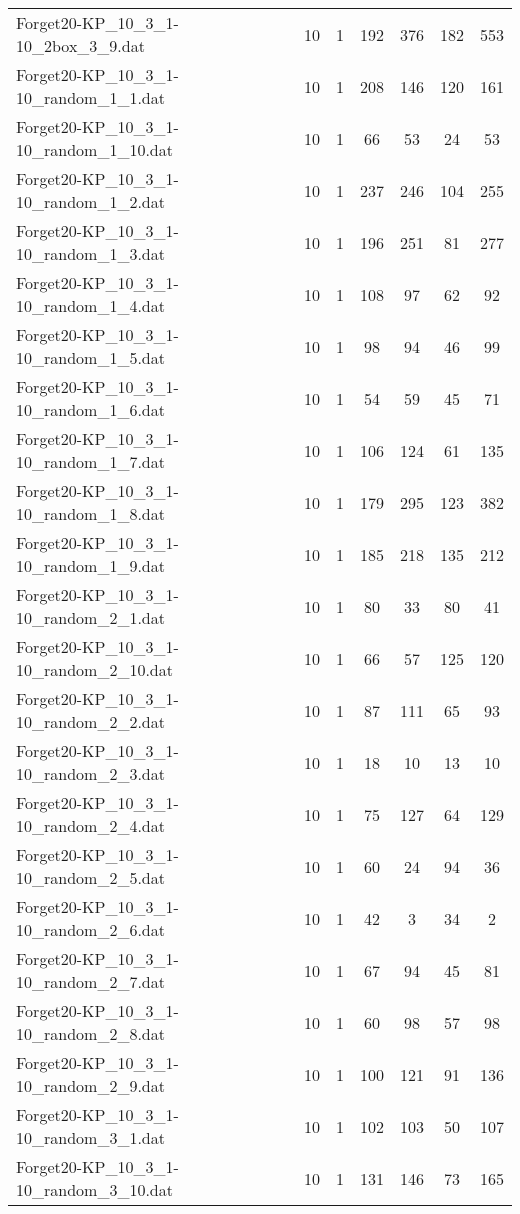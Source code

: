 \begin{table}[!ht]
\begin{tabular}{lcccccc}
Forget20-KP\_10\_3\_1-10\_2box\_3\_9.dat & 10 & 1 & 192 & 376 & 182 & 553 \\
Forget20-KP\_10\_3\_1-10\_random\_1\_1.dat & 10 & 1 & 208 & 146 & 120 & 161 \\
Forget20-KP\_10\_3\_1-10\_random\_1\_10.dat & 10 & 1 & 66 & 53 & 24 & 53 \\
Forget20-KP\_10\_3\_1-10\_random\_1\_2.dat & 10 & 1 & 237 & 246 & 104 & 255 \\
Forget20-KP\_10\_3\_1-10\_random\_1\_3.dat & 10 & 1 & 196 & 251 & 81 & 277 \\
Forget20-KP\_10\_3\_1-10\_random\_1\_4.dat & 10 & 1 & 108 & 97 & 62 & 92 \\
Forget20-KP\_10\_3\_1-10\_random\_1\_5.dat & 10 & 1 & 98 & 94 & 46 & 99 \\
Forget20-KP\_10\_3\_1-10\_random\_1\_6.dat & 10 & 1 & 54 & 59 & 45 & 71 \\
Forget20-KP\_10\_3\_1-10\_random\_1\_7.dat & 10 & 1 & 106 & 124 & 61 & 135 \\
Forget20-KP\_10\_3\_1-10\_random\_1\_8.dat & 10 & 1 & 179 & 295 & 123 & 382 \\
Forget20-KP\_10\_3\_1-10\_random\_1\_9.dat & 10 & 1 & 185 & 218 & 135 & 212 \\
Forget20-KP\_10\_3\_1-10\_random\_2\_1.dat & 10 & 1 & 80 & 33 & 80 & 41 \\
Forget20-KP\_10\_3\_1-10\_random\_2\_10.dat & 10 & 1 & 66 & 57 & 125 & 120 \\
Forget20-KP\_10\_3\_1-10\_random\_2\_2.dat & 10 & 1 & 87 & 111 & 65 & 93 \\
Forget20-KP\_10\_3\_1-10\_random\_2\_3.dat & 10 & 1 & 18 & 10 & 13 & 10 \\
Forget20-KP\_10\_3\_1-10\_random\_2\_4.dat & 10 & 1 & 75 & 127 & 64 & 129 \\
Forget20-KP\_10\_3\_1-10\_random\_2\_5.dat & 10 & 1 & 60 & 24 & 94 & 36 \\
Forget20-KP\_10\_3\_1-10\_random\_2\_6.dat & 10 & 1 & 42 & 3 & 34 & 2 \\
Forget20-KP\_10\_3\_1-10\_random\_2\_7.dat & 10 & 1 & 67 & 94 & 45 & 81 \\
Forget20-KP\_10\_3\_1-10\_random\_2\_8.dat & 10 & 1 & 60 & 98 & 57 & 98 \\
Forget20-KP\_10\_3\_1-10\_random\_2\_9.dat & 10 & 1 & 100 & 121 & 91 & 136 \\
Forget20-KP\_10\_3\_1-10\_random\_3\_1.dat & 10 & 1 & 102 & 103 & 50 & 107 \\
Forget20-KP\_10\_3\_1-10\_random\_3\_10.dat & 10 & 1 & 131 & 146 & 73 & 165 \\

\end{tabular}
\end{table}
